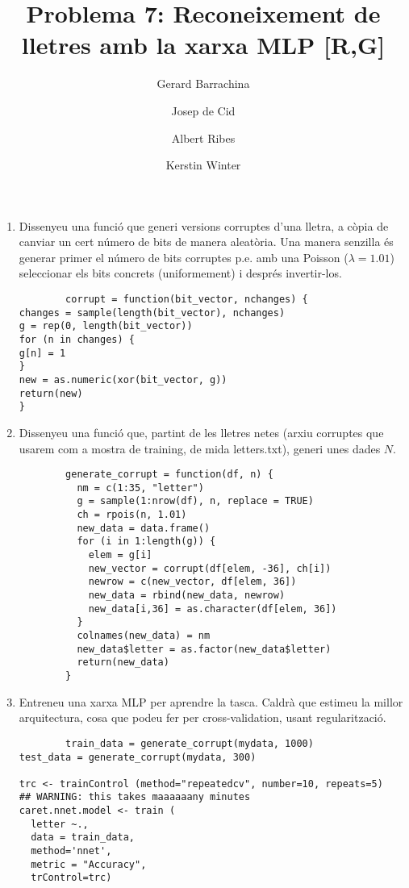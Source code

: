 \documentclass[a4paper]{article}
\author{
Gerard Barrachina
\and
Josep de Cid
\and
Albert Ribes
\and
Kerstin Winter
}
\title{Problema 7: Reconeixement de lletres amb la xarxa MLP [R,G]}
\begin{document}
    \maketitle

    \begin{enumerate}
        \item Dissenyeu una funció que generi versions corruptes d'una lletra, a còpia de canviar un cert número
        de bits de manera aleatòria. Una manera senzilla és generar primer el número de bits corruptes p.e.
        amb una Poisson ($\lambda = 1.01$)
        seleccionar els bits concrets (uniformement) i després invertir-los.

        \begin{lstlisting}
        corrupt = function(bit_vector, nchanges) {
changes = sample(length(bit_vector), nchanges)
g = rep(0, length(bit_vector))
for (n in changes) {
g[n] = 1
}
new = as.numeric(xor(bit_vector, g))
return(new)
}
        \end{lstlisting}

        \item Dissenyeu una funció que, partint de les lletres netes (arxiu
        corruptes que usarem com a mostra de training, de mida
        letters.txt),
        generi unes dades
        $N$.

        \begin{lstlisting}
        generate_corrupt = function(df, n) {
          nm = c(1:35, "letter")
          g = sample(1:nrow(df), n, replace = TRUE)
          ch = rpois(n, 1.01)
          new_data = data.frame()
          for (i in 1:length(g)) {
            elem = g[i]
            new_vector = corrupt(df[elem, -36], ch[i])
            newrow = c(new_vector, df[elem, 36])
            new_data = rbind(new_data, newrow)
            new_data[i,36] = as.character(df[elem, 36])
          }
          colnames(new_data) = nm
          new_data$letter = as.factor(new_data$letter)
          return(new_data)
        }
        \end{lstlisting}

        \item Entreneu una xarxa MLP per aprendre la tasca. Caldrà que estimeu la millor arquitectura, cosa
        que podeu fer per cross-validation, usant regularització.
        \begin{lstlisting}
        train_data = generate_corrupt(mydata, 1000)
test_data = generate_corrupt(mydata, 300)

trc <- trainControl (method="repeatedcv", number=10, repeats=5)
## WARNING: this takes maaaaaany minutes
caret.nnet.model <- train (
  letter ~.,
  data = train_data,
  method='nnet',
  metric = "Accuracy",
  trControl=trc)


\end{lstlisting}
\end{enumerate}
\end{document}
